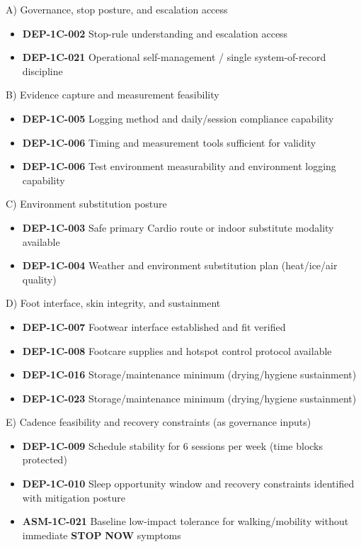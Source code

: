 \documentclass[10pt]{article}
\begin{document}
\begin{enumerate}
A) Governance, stop posture, and escalation access

\begin{itemize}
\item \textbf{DEP-1C-002} Stop-rule understanding and escalation access
\item \textbf{DEP-1C-021} Operational self-management / single system-of-record discipline
\end{itemize}

B) Evidence capture and measurement feasibility

\begin{itemize}
\item \textbf{DEP-1C-005} Logging method and daily/session compliance capability
\item \textbf{DEP-1C-006} Timing and measurement tools sufficient for validity
\item \textbf{DEP-1C-006} Test environment measurability and environment logging capability
\end{itemize}

C) Environment substitution posture

\begin{itemize}
\item \textbf{DEP-1C-003} Safe primary Cardio route or indoor substitute modality available
\item \textbf{DEP-1C-004} Weather and environment substitution plan (heat/ice/air quality)
\end{itemize}

D) Foot interface, skin integrity, and sustainment

\begin{itemize}
\item \textbf{DEP-1C-007} Footwear interface established and fit verified
\item \textbf{DEP-1C-008} Footcare supplies and hotspot control protocol available
\item \textbf{DEP-1C-016} Storage/maintenance minimum (drying/hygiene sustainment)
\item \textbf{DEP-1C-023} Storage/maintenance minimum (drying/hygiene sustainment)
\end{itemize}

E) Cadence feasibility and recovery constraints (as governance inputs)

\begin{itemize}
\item \textbf{DEP-1C-009} Schedule stability for 6 sessions per week (time blocks protected)
\item \textbf{DEP-1C-010} Sleep opportunity window and recovery constraints identified with mitigation posture
\item \textbf{ASM-1C-021} Baseline low-impact tolerance for walking/mobility without immediate \textbf{STOP} \textbf{NOW} symptoms
\end{itemize}


\end{enumerate}
\end{document}
